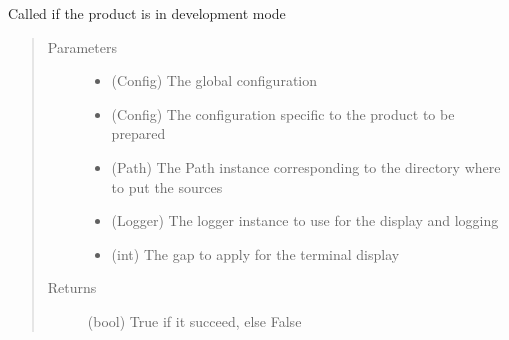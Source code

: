 \documentclass[a4paper,10pt,english]{sphinxmanual}
\begin{document}

\begin{fulllineitems}
\label{\detokenize{apidoc_commands/commands:commands.source.get_source_for_dev}}
Called if the product is in development mode
\begin{quote}\begin{description}
\item[{Parameters}] \leavevmode\begin{itemize}
\item {} 
 \textendash{} (Config) The global configuration

\item {} 
 \textendash{} (Config) 
The configuration specific to the product to be prepared

\item {} 
 \textendash{} (Path)
The Path instance corresponding to the directory where to put the sources

\item {} 
 \textendash{} (Logger)
The logger instance to use for the display and logging

\item {} 
 \textendash{} (int) The gap to apply for the terminal display

\end{itemize}

\item[{Returns}] \leavevmode
(bool) True if it succeed, else False

\end{description}\end{quote}

\end{fulllineitems}

\end{document}
